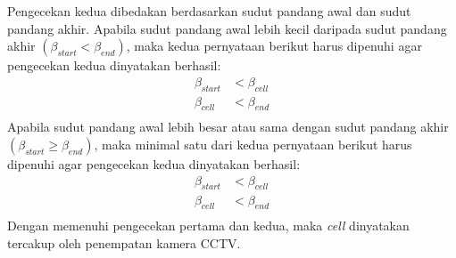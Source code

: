 Pengecekan kedua dibedakan berdasarkan sudut pandang awal dan sudut pandang akhir. Apabila sudut pandang awal lebih kecil daripada sudut pandang akhir \((\beta_{start}<\beta_{end})\), maka kedua pernyataan berikut harus dipenuhi agar pengecekan kedua dinyatakan berhasil:
\begin{equation}
	\begin{split}
		\beta_{start} &< \beta_{cell}\\
		\beta_{cell} &< \beta_{end}\\
	\end{split}
\end{equation}
Apabila sudut pandang awal lebih besar atau sama dengan sudut pandang akhir \((\beta_{start}\geq\beta_{end})\), maka minimal satu dari kedua pernyataan berikut harus dipenuhi agar pengecekan kedua dinyatakan berhasil:
\begin{equation}
	\begin{split}
		\beta_{start} &< \beta_{cell}\\
		\beta_{cell} &< \beta_{end}\\
	\end{split}
\end{equation}
Dengan memenuhi pengecekan pertama dan kedua, maka \textit{cell} dinyatakan tercakup oleh penempatan kamera CCTV.

%
%


